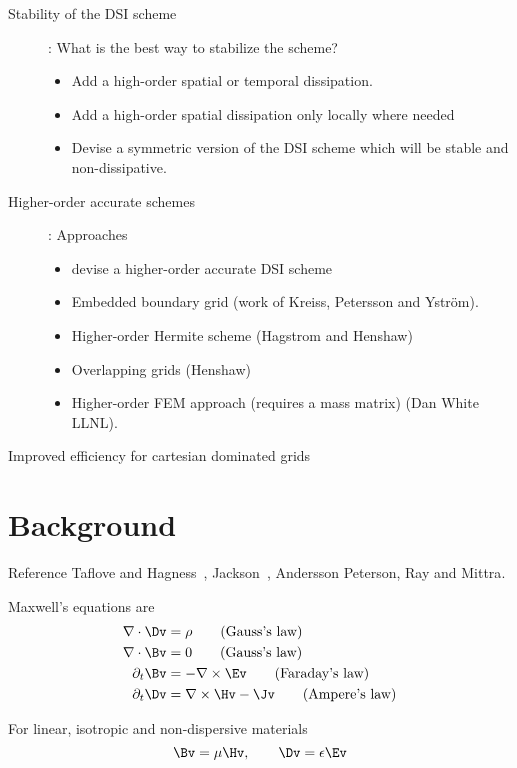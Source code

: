 \documentclass[10pt]{article}
\newcommand{\grad}{\nabla}
\begin{document}
\begin{description}
  \item[Stability of the DSI scheme] : What is the best way to stabilize the scheme?
    \begin{itemize}
       \item Add a high-order spatial or temporal dissipation.
       \item Add a high-order spatial dissipation only locally where needed
       \item Devise a symmetric version of the DSI scheme which will be stable and non-dissipative.
    \end{itemize}
  \item[Higher-order accurate schemes]: Approaches
    \begin{itemize}
       \item devise a higher-order accurate DSI scheme
       \item Embedded boundary grid (work of Kreiss, Petersson and Ystr\"om).
       \item Higher-order Hermite scheme (Hagstrom and Henshaw)
       \item Overlapping grids (Henshaw)
       \item Higher-order FEM approach (requires a mass matrix) (Dan White LLNL).
    \end{itemize}
  \item[Improved efficiency for cartesian dominated grids]
\end{description}

\section{Background}

Reference Taflove and Hagness~\cite{Taflove2000}, Jackson~\cite{Jackson}, Andersson\cite{Andersson2001}
Peterson, Ray and Mittra\cite{Peterson98}.

Maxwell's equations are
\begin{align}
  \grad\cdot \Dv & = \rho \qquad\mbox{(Gauss's law)} \\
  \grad\cdot\Bv & = 0 \qquad\mbox{(Gauss's law)} \\
  \partial_t \Bv &= -\grad\times\Ev \qquad\mbox{(Faraday's law)} \\
  \partial_t \Dv &=  \grad\times\Hv -\Jv \qquad\mbox{(Ampere's law)}
\end{align}

For linear, isotropic and non-dispersive materials
\[
    \Bv = \mu \Hv, \qquad \Dv = \eps \Ev
\]
\end{document}
